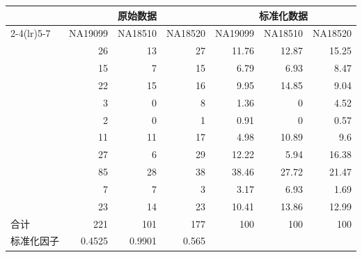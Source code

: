 \begin{table}[htbp]
\centering
{}
\label{tab:ch04a-01}
\small
\setlength{\tabcolsep}{5pt}
\begin{tabular}{lrrrrrr}
\toprule
&\multicolumn{3}{c}{原始数据}&\multicolumn{3}{c}{标准化数据}\\
\cmidrule(lr){2-4}\cmidrule(lr){5-7}
&NA19099&NA18510&NA18520&NA19099&NA18510&NA18520\\
\midrule
 & 26 & 13 & 27 & 11.76 & 12.87 & 15.25\\
 & 15 & 7 & 15 & 6.79 & 6.93 & 8.47\\
 & 22 & 15 & 16 & 9.95 & 14.85 & 9.04\\
 & 3 & 0 & 8 & 1.36 & 0 & 4.52\\
 & 2 & 0 & 1 & 0.91 & 0 & 0.57\\
 & 11 & 11 & 17 & 4.98 & 10.89 & 9.6\\
 & 27 & 6 & 29 & 12.22 & 5.94 & 16.38\\
 & 85 & 28 & 38 & 38.46 & 27.72 & 21.47\\
 & 7 & 7 & 3 & 3.17 & 6.93 & 1.69\\
 & 23 & 14 & 23 & 10.41 & 13.86 & 12.99\\
合计 & 221 & 101 & 177 & 100 & 100 & 100\\
标准化因子 & 0.4525 & 0.9901 & 0.565 & & &\\
\bottomrule
\end{tabular}
\end{table}
